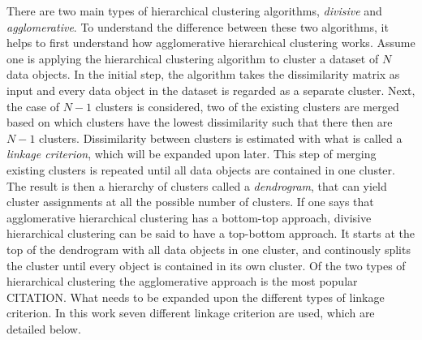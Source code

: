 There are two main types of hierarchical clustering algorithms, \textit{divisive} and \textit{agglomerative}. To understand the difference between these two algorithms, it helps to first understand how agglomerative hierarchical clustering works. Assume one is applying the hierarchical clustering algorithm to cluster a dataset of $N$ data objects. In the initial step, the algorithm takes the dissimilarity matrix as input and every data object in the dataset is regarded as a separate cluster. Next, the case of $N-1$ clusters is considered, two of the existing clusters are merged based on which clusters have the lowest dissimilarity such that there then are $N-1$ clusters. Dissimilarity between clusters is estimated with what is called a \textit{linkage criterion}, which will be expanded upon later. This step of merging existing clusters is repeated until all data objects are contained in one cluster. The result is then a hierarchy of clusters called a \textit{dendrogram}, that can yield cluster assignments at all the possible number of clusters. If one says that agglomerative hierarchical clustering has a bottom-top approach, divisive hierarchical clustering can be said to have a top-bottom approach. It starts at the top of the dendrogram with all data objects in one cluster, and continously splits the cluster until every object is contained in its own cluster. Of the two types of hierarchical clustering the agglomerative approach is the most popular CITATION. What needs to be expanded upon the different types of linkage criterion. In this work seven different linkage criterion are used, which are detailed below.

